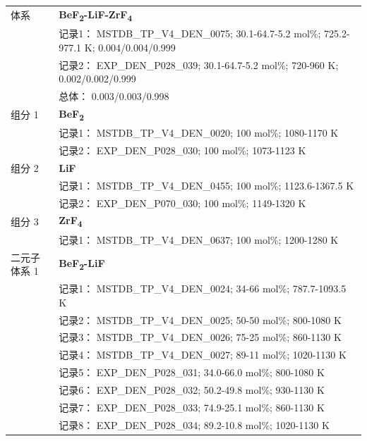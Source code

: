 \documentclass[12pt]{article}
\begin{document}
{\begin{longtable}[]{@{}
  >{\raggedright\arraybackslash}p{}
  >{\raggedright\arraybackslash}p{}@{}}
\midrule
体系 & \textbf{BeF\textsubscript{2}-LiF-ZrF\textsubscript{4}} \\
 & 记录1： MSTDB\_TP\_V4\_DEN\_0075; 30.1-64.7-5.2 mol\%; 725.2-977.1 K; 0.004/0.004/0.999 \\
 & 记录2： EXP\_DEN\_P028\_039; 30.1-64.7-5.2 mol\%; 720-960 K; 0.002/0.002/0.999 \\
 & 总体： 0.003/0.003/0.998  \\

组分 1  & \textbf{BeF\textsubscript{2}} \\
 & 记录1： MSTDB\_TP\_V4\_DEN\_0020; 100 mol\%; 1080-1170 K \\
 & 记录2： EXP\_DEN\_P028\_030; 100 mol\%; 1073-1123 K  \\

组分 2  & \textbf{LiF} \\
 & 记录1： MSTDB\_TP\_V4\_DEN\_0455; 100 mol\%; 1123.6-1367.5 K \\
 & 记录2： EXP\_DEN\_P070\_030; 100 mol\%; 1149-1320 K  \\

组分 3  & \textbf{ZrF\textsubscript{4}} \\
 & 记录1： MSTDB\_TP\_V4\_DEN\_0637; 100 mol\%; 1200-1280 K  \\

二元子体系 1  & \textbf{BeF\textsubscript{2}-LiF} \\
 & 记录1： MSTDB\_TP\_V4\_DEN\_0024; 34-66 mol\%; 787.7-1093.5 K \\
 & 记录2： MSTDB\_TP\_V4\_DEN\_0025; 50-50 mol\%; 800-1080 K \\
 & 记录3： MSTDB\_TP\_V4\_DEN\_0026; 75-25 mol\%; 860-1130 K \\
 & 记录4： MSTDB\_TP\_V4\_DEN\_0027; 89-11 mol\%; 1020-1130 K \\
 & 记录5： EXP\_DEN\_P028\_031; 34.0-66.0 mol\%; 800-1080 K \\
 & 记录6： EXP\_DEN\_P028\_032; 50.2-49.8 mol\%; 930-1130 K \\
 & 记录7： EXP\_DEN\_P028\_033; 74.9-25.1 mol\%; 860-1130 K \\
 & 记录8： EXP\_DEN\_P028\_034; 89.2-10.8 mol\%; 1020-1130 K  \\


\end{longtable}}
\end{document}
